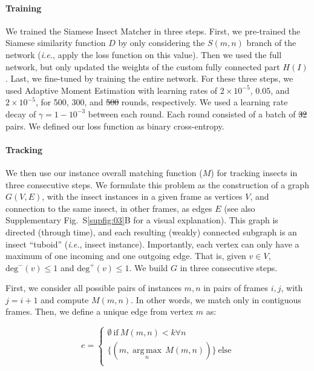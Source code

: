 \documentclass[12pt]{article}
\providecommand{\DIFaddtex}[1]{{\protect\color{blue}\uwave{#1}}} %
\providecommand{\DIFdeltex}[1]{{\protect\color{red}\sout{#1}}}                      %
\providecommand{\DIFaddbegin}{} %
\providecommand{\DIFaddend}{} %
\providecommand{\DIFdelbegin}{} %
\providecommand{\DIFdelend}{} %
\providecommand{\DIFadd}[1]{\texorpdfstring{\DIFaddtex{#1}}{#1}} %
\providecommand{\DIFdel}[1]{\texorpdfstring{\DIFdeltex{#1}}{}} %
\newcommand{\DIFscaledelfig}{0.5}
\newlength{\DIFdelgraphicswidth} %
\newlength{\DIFdelgraphicsheight} %
\newcommand{\DIFaddincludegraphics}[2][]{{\color{blue}\fbox{\DIFOincludegraphics[#1]{#2}}}} %
\newcommand{\DIFdelincludegraphics}[2][]{%
\sbox{\DIFdelgraphicsbox}{\DIFOincludegraphics[#1]{#2}}%
\settoboxwidth{\DIFdelgraphicswidth}{\DIFdelgraphicsbox} %
\settoboxtotalheight{\DIFdelgraphicsheight}{\DIFdelgraphicsbox} %
\scalebox{\DIFscaledelfig}{%
\parbox[b]{\DIFdelgraphicswidth}{\usebox{\DIFdelgraphicsbox}\\[-\baselineskip] \rule{\DIFdelgraphicswidth}{0em}}\llap{\resizebox{\DIFdelgraphicswidth}{\DIFdelgraphicsheight}{%
\setlength{\unitlength}{\DIFdelgraphicswidth}%
\begin{picture}(1,1)%
\thicklines\linethickness{2pt} %
{\color[rgb]{1,0,0}\put(0,0){\framebox(1,1){}}}%
{\color[rgb]{1,0,0}\put(0,0){\line( 1,1){1}}}%
{\color[rgb]{1,0,0}\put(0,1){\line(1,-1){1}}}%
\end{picture}%
}\hspace*{3pt}}} %
} %
\DeclareRobustCommand{\DIFaddbegin}{\DIFOaddbegin \let\includegraphics\DIFaddincludegraphics} %
\DeclareRobustCommand{\DIFaddend}{\DIFOaddend \let\includegraphics\DIFOincludegraphics} %
\DeclareRobustCommand{\DIFdelbegin}{\DIFOdelbegin \let\includegraphics\DIFdelincludegraphics} %
\DeclareRobustCommand{\DIFdelend}{\DIFOaddend \let\includegraphics\DIFOincludegraphics} %
\begin{document}
\begin{linenumbers}
		\paragraph{Training}
		We trained the Siamese Insect Matcher in three steps. First, we pre-trained the Siamese similarity function $D$ by only considering the $S(m,n)$ branch of the network (\emph{i.e.}, apply the loss function on this value). Then we used the full network, but only updated the weights of the custom fully connected part $H(I)$. Last, we fine-tuned by training the entire network. For these three steps, we used Adaptive Moment Estimation with learning rates of $2\times{}10^{-5}$, $0.05$, and $2\times{}10^{-5}$, for 500, 300, and \DIFdelbegin \DIFdel{500 }\DIFdelend \DIFaddbegin \DIFadd{5000 }\DIFaddend rounds, respectively. We used a learning rate decay of $\gamma = 1- 10^{-3}$ between each round. Each round consisted of a batch of \DIFdelbegin \DIFdel{32 }\DIFdelend \DIFaddbegin \DIFadd{128 }\DIFaddend pairs. We defined our loss function as binary cross-entropy.

		\paragraph{Tracking}
		We then use our instance overall matching function ($M$) for tracking insects in three consecutive steps. We formulate this problem as the construction of a graph $G(V, E)$, with the insect instances in a given frame as vertices $V$, and connection to the same insect, in other frames, as edges $E$ (see also Supplementary Fig.~S\ref{supfig:03}B for a visual explanation). This graph is directed (through time), and each resulting (weakly) connected subgraph is an insect “tuboid” (\emph{i.e.}, insect instance). Importantly, each vertex can only have a maximum of one incoming and one outgoing edge. That is, given $v \in V$, $\text{deg}^-(v) \le 1$ and $\text{deg}^+(v) \le 1$. We build $G$ in three consecutive steps. 

		First, we consider all possible pairs of instances $m, n$ in pairs of frames $i, j$, with $j=i+1$ and compute $M(m,n)$. In other words, we match only in contiguous frames. Then, we define a unique edge from vertex $m$ as:

		\begin{equation}
			\label{eq:01}
			e = \begin{cases}
				\emptyset~\text{if}~M(m,n)<k \forall n \\
				\{(m, \underset{n}{\operatorname{arg\,max}}\,M(m,n))\}~\text{else} \\
			\end{cases}
		\end{equation}


\end{linenumbers}
\end{document}
